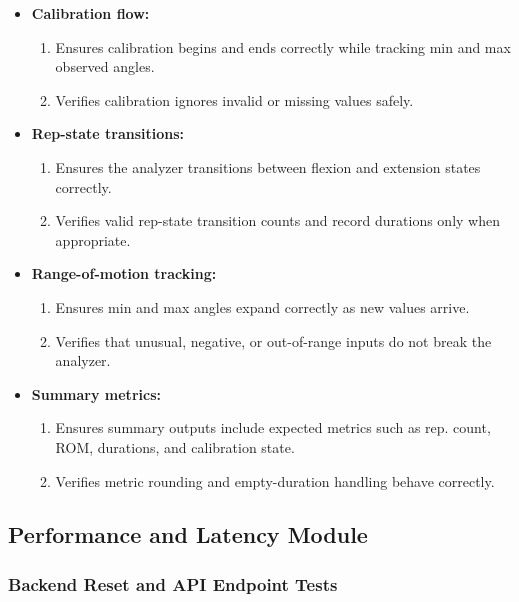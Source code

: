 \documentclass[12pt, titlepage]{article}
\begin{document}
\begin{itemize}
    \item \textbf{Calibration flow:}
    \begin{enumerate}
        \item Ensures calibration begins and ends correctly while tracking min and max observed angles.
        \item Verifies calibration ignores invalid or missing values safely.
    \end{enumerate}

    \item \textbf{Rep-state transitions:}
    \begin{enumerate}
        \item Ensures the analyzer transitions between flexion and extension states correctly.
        \item Verifies valid rep-state transition counts and record durations only when appropriate.
    \end{enumerate}

    \item \textbf{Range-of-motion tracking:}
    \begin{enumerate}
        \item Ensures min and max angles expand correctly as new values arrive.
        \item Verifies that unusual, negative, or out-of-range inputs do not break the analyzer.
    \end{enumerate}

    \item \textbf{Summary metrics:}
    \begin{enumerate}
        \item Ensures summary outputs include expected metrics such as rep. count, ROM, durations, and calibration state.
        \item Verifies metric rounding and empty-duration handling behave correctly.
    \end{enumerate}
\end{itemize}

\subsection{Performance and Latency Module}

\subsubsection{Backend Reset and API Endpoint Tests}
\end{document}
